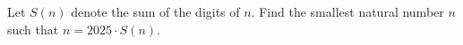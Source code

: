Let $S(n)$ denote the sum of the digits of $n$. Find the smallest natural number $n$ such that $n=2025 \cdot S(n)$.
